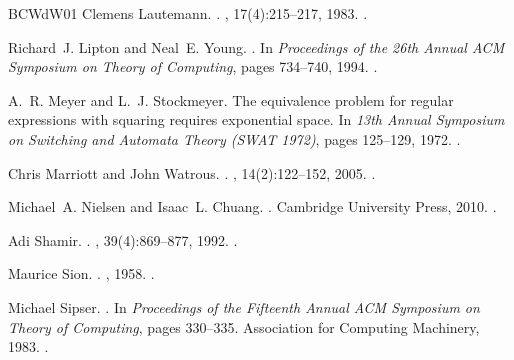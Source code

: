 \documentclass[10pt,a4paper]{article}
\theoremstyle{definition}
\newcommand{\class}[1]{\ensuremath{\mathsf{#1}}\xspace}
\newcommand{\BPP}{\class{BPP}}
\begin{document}
\begin{thebibliography}{BCWdW01}
Clemens Lautemann.
\newblock {$\BPP$ and the polynomial hierarchy}.
, 17(4):215--217, 1983.
\newblock \href {https://doi.org/10.1016/0020-0190(83)90044-3}
  {}.

Richard~J. Lipton and Neal~E. Young.
.
\newblock In {\em Proceedings of the 26th Annual ACM Symposium on Theory of
  Computing}, pages 734--740, 1994.
\newblock \href {https://doi.org/10.1145/195058.195447}
  {}.

A.~R. Meyer and L.~J. Stockmeyer.
\newblock The equivalence problem for regular expressions with squaring
  requires exponential space.
\newblock In {\em 13th Annual Symposium on Switching and Automata Theory (SWAT
  1972)}, pages 125--129, 1972.
\newblock \href {https://doi.org/10.1109/SWAT.1972.29}
  {}.

Chris Marriott and John Watrous.
.
, 14(2):122--152, 2005.
\newblock \href {https://doi.org/10.1007/s00037-005-0194-x}
  {}.

Michael~A. Nielsen and Isaac~L. Chuang.
.
\newblock Cambridge University Press, 2010.
\newblock \href {https://doi.org/10.1017/CBO9780511976667}
  {}.

Adi Shamir.
.
, 39(4):869–877, 1992.
\newblock \href {https://doi.org/10.1145/146585.146609}
  {}.

Maurice Sion.
.
, 1958.
\newblock \href {https://doi.org/10.2140/pjm.1958.8.171}
  {}.

Michael Sipser.
.
\newblock In {\em Proceedings of the Fifteenth Annual ACM Symposium on Theory
  of Computing}, pages 330--335. Association for Computing Machinery, 1983.
\newblock \href {https://doi.org/10.1145/800061.808762}
  {}.


\end{thebibliography}
\end{document}
